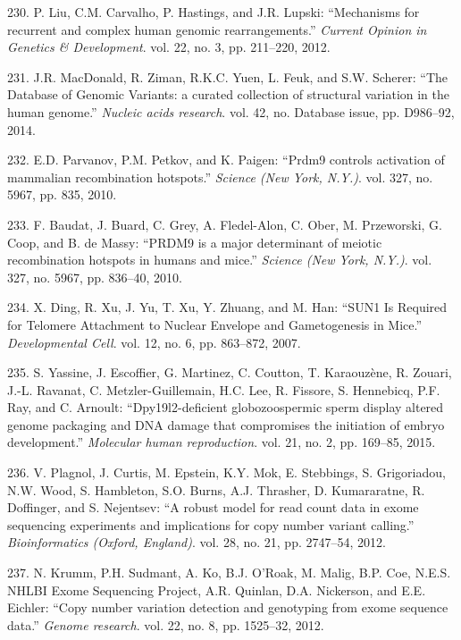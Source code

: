 \documentclass[12pt,a4paper,twoside]{ugathesis}
\theoremstyle{definition}
\theoremstyle{definition}
\theoremstyle{definition}
\theoremstyle{remark}
\begin{document}
\hypertarget{ref-Liu2012}{}
230. P. Liu, C.M. Carvalho, P. Hastings, and J.R. Lupski: ``Mechanisms
for recurrent and complex human genomic rearrangements.'' \emph{Current
Opinion in Genetics \& Development}. vol. 22, no. 3, pp. 211--220, 2012.

\hypertarget{ref-MacDonald2014}{}
231. J.R. MacDonald, R. Ziman, R.K.C. Yuen, L. Feuk, and S.W. Scherer:
``The Database of Genomic Variants: a curated collection of structural
variation in the human genome.'' \emph{Nucleic acids research}. vol. 42,
no. Database issue, pp. D986--92, 2014.

\hypertarget{ref-Parvanov2010}{}
232. E.D. Parvanov, P.M. Petkov, and K. Paigen: ``Prdm9 controls
activation of mammalian recombination hotspots.'' \emph{Science (New
York, N.Y.)}. vol. 327, no. 5967, pp. 835, 2010.

\hypertarget{ref-Baudat2010}{}
233. F. Baudat, J. Buard, C. Grey, A. Fledel-Alon, C. Ober, M.
Przeworski, G. Coop, and B. de Massy: ``PRDM9 is a major determinant of
meiotic recombination hotspots in humans and mice.'' \emph{Science (New
York, N.Y.)}. vol. 327, no. 5967, pp. 836--40, 2010.

\hypertarget{ref-Ding2007}{}
234. X. Ding, R. Xu, J. Yu, T. Xu, Y. Zhuang, and M. Han: ``SUN1 Is
Required for Telomere Attachment to Nuclear Envelope and Gametogenesis
in Mice.'' \emph{Developmental Cell}. vol. 12, no. 6, pp. 863--872,
2007.

\hypertarget{ref-Yassine2015a}{}
235. S. Yassine, J. Escoffier, G. Martinez, C. Coutton, T. Karaouzène,
R. Zouari, J.-L. Ravanat, C. Metzler-Guillemain, H.C. Lee, R. Fissore,
S. Hennebicq, P.F. Ray, and C. Arnoult: ``Dpy19l2-deficient
globozoospermic sperm display altered genome packaging and DNA damage
that compromises the initiation of embryo development.'' \emph{Molecular
human reproduction}. vol. 21, no. 2, pp. 169--85, 2015.

\hypertarget{ref-Plagnol2012}{}
236. V. Plagnol, J. Curtis, M. Epstein, K.Y. Mok, E. Stebbings, S.
Grigoriadou, N.W. Wood, S. Hambleton, S.O. Burns, A.J. Thrasher, D.
Kumararatne, R. Doffinger, and S. Nejentsev: ``A robust model for read
count data in exome sequencing experiments and implications for copy
number variant calling.'' \emph{Bioinformatics (Oxford, England)}. vol.
28, no. 21, pp. 2747--54, 2012.

\hypertarget{ref-Krumm2012}{}
237. N. Krumm, P.H. Sudmant, A. Ko, B.J. O'Roak, M. Malig, B.P. Coe,
N.E.S. NHLBI Exome Sequencing Project, A.R. Quinlan, D.A. Nickerson, and
E.E. Eichler: ``Copy number variation detection and genotyping from
exome sequence data.'' \emph{Genome research}. vol. 22, no. 8, pp.
1525--32, 2012.
\end{document}
